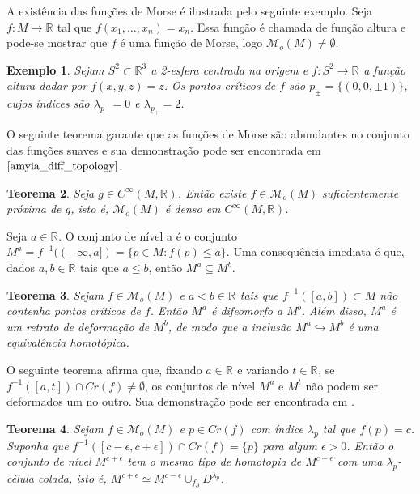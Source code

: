 \documentclass[12pt]{book}
\newtheorem{teorema}{Teorema}[section]
\newtheorem{exemplo}[teorema]{Exemplo}
\newcommand{\funcoesmorse}[1]{\mathcal{M}_{o}(#1)}
\newcommand{\funcoessuaves}[1]{C^{\infty}(#1, \real{})}
\newcommand{\pontoscriticos}[1]{\textit{Cr}(#1)}
\newcommand{\real}[1]{\mathbb{R}^{#1}}
\newcommand{\reta}{\real{}}
\begin{document}
	
	A existência das funções de Morse é ilustrada pelo seguinte exemplo. Seja $f:M\to \reta$ tal que $f(x_{1}, \dots, x_{n}) = x_{n}$. Essa função é chamada de função altura e pode-se mostrar que $f$ é uma função de Morse, logo $\funcoesmorse{M} \neq \emptyset$.
	
	\begin{exemplo}
		Sejam $S^{2} \subset \real{3}$ a 2-esfera centrada na origem e $f:S^{2}\to \reta$ a função altura dadar por $f(x,y,z) = z$. Os pontos críticos de $f$ são $p_{\pm} = \{(0,0,\pm 1)\}$, cujos índices são $\lambda_{p_{-} } = 0$ e $\lambda_{p_{+}} = 2$.
	\end{exemplo}
	
	O seguinte teorema garante que as funções de Morse são abundantes no conjunto das funções suaves e sua demonstração pode ser encontrada em $\cite{amyia_diff_topology}$.
	
	\begin{teorema}
		Seja $g\in \funcoessuaves{M}$. Então existe $f \in \funcoesmorse{M}$ suficientemente próxima de $g$, isto é, $\funcoesmorse{M}$ é denso em $\funcoessuaves{M}$.
	\end{teorema} 
	
	Seja $a \in \reta$. O conjunto de nível a é o conjunto $M^{a}= f^{-1}((-\infty, a]) = \{p \in M: f(p)\leq a\}$. Uma consequência imediata é que, dados $a,b \in \reta$ tais que $a\leq b$, então $M^{a} \subseteq M^{b}$.
	
	\begin{teorema}
		Sejam $f \in \funcoesmorse{M}$ e $a<b \in \reta$ tais que $f^{-1}([a,b])\subset M$ não contenha pontos críticos de $f$. Então $M^{a}$ é difeomorfo a $M^{b}$. Além disso, $M^{a}$ é um retrato de deformação de $M^{b}$, de modo que a inclusão  $M^{a} \hookrightarrow M^{b}$ é uma equivalência homotópica.
	\end{teorema}
	
	O seguinte teorema afirma que, fixando $a \in \reta$ e variando $t \in \reta$, se $f^{-1}([a,t]) \cap \pontoscriticos{f} \neq \emptyset$, os conjuntos de nível $M^{a}$ e $M^{t}$ não podem ser deformados um no outro.  Sua demonstração pode ser encontrada em \cite{milnor}.
	
	\begin{teorema}\label{teorema cw_complexo_ponto_critico_morse}
		Sejam $f\in \funcoesmorse{M}$ e $p\in \pontoscriticos{f}$ com índice $\lambda_{p}$ tal que $f(p) = c$. Suponha que $f^{-1}([c-\epsilon,c+\epsilon])\cap \pontoscriticos{f} = \{p\}$ para algum $\epsilon>0$. Então o conjunto de nível $M^{c+\epsilon}$ tem o mesmo tipo de homotopia de $M^{c-\epsilon}$ com uma $\lambda_{p}$-célula colada, isto é, $M^{c+\epsilon} \simeq M^{c-\epsilon}\cup_{f_{\partial}} D^{\lambda_{p}}$.
	\end{teorema}
	
\end{document}
